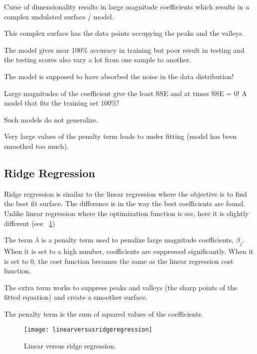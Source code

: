 	\begin{bulletedlist}
		\item Curse of dimensionality results in large magnitude coefficients which results in a complex undulated surface / model.
		\item This complex surface has the data points occupying the peaks and the valleys.
		\item The model gives near 100\% accuracy in training but poor result in testing and the testing scores also vary a lot from one sample to another.
		\item The model is supposed to have absorbed the noise in the data distribution!
		\item Large magnitudes of the coefficient give the least SSE and at times SSE = 0! A model that fits the training set 100\%!
		\item Such models do not generalize.
		\item Very large values of the penalty term leads to under fitting (model has been smoothed too much).
	\end{bulletedlist}

	\subsection{Ridge Regression}
	\begin{bulletedlist}
		\item Ridge regression is similar to the linear regression where the objective is to find the best fit surface. The difference is in the way the best coefficients are found. Unlike linear regression where the optimization function is \gls{sse}, here it is slightly different (see \figurename~\ref{fig:linearversusridgeregression})
		\item The term $\lambda$ is a penalty term used to penalize large magnitude coefficients, $\beta_j$.  When it is set to a high number, coefficients are suppressed significantly.  When it is set to 0, the cost function becomes the same as the linear regression cost function.
		\item The extra term works to suppress peaks and valleys (the sharp points of the fitted equation) and create a smoother surface.
		\item The penalty term is the sum of squared values of the coefficients.
	\end{bulletedlist}

	\begin{figure}[tbh]
		\centering
		\texttt{[image: linearversusridgeregression]}
		\caption{Linear versus ridge regression.}
		\label{fig:linearversusridgeregression}
	\end{figure}

